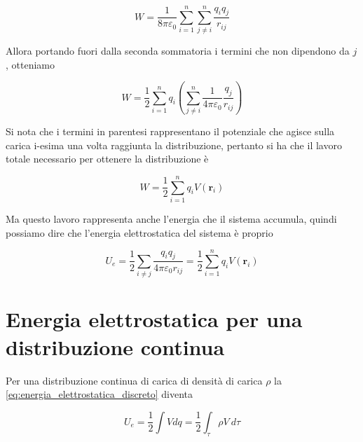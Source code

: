 \begin{equation}
    W = \frac{1}{8 \pi \varepsilon_0} \sum_{i = 1} ^ {n} \sum_{j \neq i} ^n \frac{q_i q_j}{r_{ij}}
\end{equation}

Allora portando fuori dalla seconda sommatoria i termini che non dipendono da $j$, otteniamo 

\begin{equation}
    W = \frac{1}{2} \sum_{i = 1} ^n q_i \left( \sum_{j \neq i}^n \frac{1}{4 \pi \varepsilon_0} \frac{q_j}{r_{ij}} \right)
\end{equation}

Si nota che i termini in parentesi rappresentano il potenziale che agisce sulla carica i-esima una volta raggiunta la distribuzione, pertanto si ha che il lavoro totale necessario per ottenere la distribuzione è 

\begin{equation}
    W = \frac{1}{2} \sum_{i = 1}^n q_i V(\mathbf{r}_i)
\end{equation}

Ma questo lavoro rappresenta anche l'energia che il sistema accumula, quindi possiamo dire che l'energia elettrostatica del sistema è proprio 

\begin{tcolorbox}[colback=yellow!10!white, colframe=orange!70!black, boxrule=0.8pt]
\begin{equation}
    U_e = \frac{1}{2} \sum_{i \neq j} \frac{q_i q_j}{4 \pi \varepsilon_0 r_{ij}} = \frac{1}{2} \sum_{i = 1}^n q_i V(\mathbf{r}_i)
    \label{eq:energia_elettrostatica_discreto}
\end{equation}
\end{tcolorbox}

\section{Energia elettrostatica per una distribuzione continua}

Per una distribuzione continua di carica di densità di carica $\rho$ la \ref{eq:energia_elettrostatica_discreto} diventa

\begin{tcolorbox}[colback=yellow!10!white, colframe=orange!70!black, boxrule=0.8pt]
\begin{equation}
    U_e = \frac{1}{2} \int V dq = \frac{1}{2} \int_{\tau} \rho V \ d\tau
    \label{eq:energia_elettrostatica_continuo}
\end{equation}
\end{tcolorbox}

